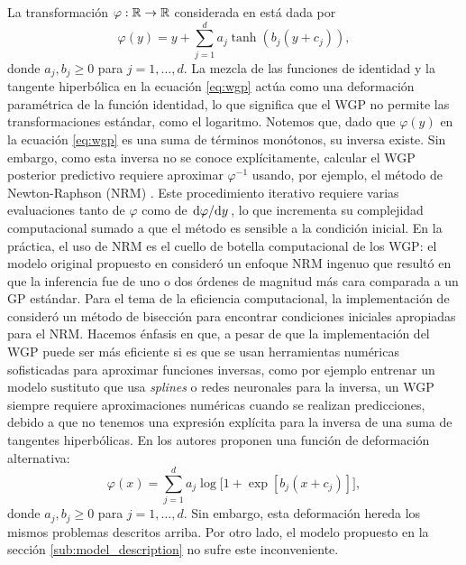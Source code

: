 La transformación \(\varphi : \mathbb{R} \to \mathbb{R}\) considerada en \cite{snelson2004warped} está dada por
\begin{equation}
	\label{eq:wgp}
	\varphi (y) = y + \sum_{j=1}^{d} a_{j} \tanh(b_{j}(y + c_{j})),
\end{equation}
donde \(a_{j}, b_{j} \geq 0\) para \(j = 1, \dotsc, d\). La mezcla de las funciones de identidad y la tangente hiperbólica en la ecuación \eqref{eq:wgp} actúa como una deformación paramétrica de la función identidad, lo que significa que el WGP no permite las transformaciones estándar, como el logaritmo. Notemos que, dado que \(\varphi(y)\) en la ecuación \eqref{eq:wgp} es una suma de términos monótonos, su inversa existe. Sin embargo, como esta inversa no se conoce explícitamente, calcular el WGP posterior predictivo requiere aproximar \(\varphi^{-1}\) usando, por ejemplo, el método de Newton-Raphson (NRM) \cite{atkinson2008introduction}. Este procedimiento iterativo requiere varias evaluaciones tanto de \(\varphi\) como de \(\dv*{\varphi}{y}\), lo que incrementa su complejidad computacional sumado a que el método es sensible a la condición inicial. En la práctica, el uso de NRM es el cuello de botella computacional de los WGP: el modelo original propuesto en \cite{snelson2004warped} consideró un enfoque NRM ingenuo que resultó en que la inferencia fue de uno o dos órdenes de magnitud más cara comparada a un GP estándar. Para el tema de la eficiencia computacional, la implementación de \cite{snelson2004warped} consideró un método de bisección para encontrar condiciones iniciales apropiadas para el NRM. Hacemos énfasis en que, a pesar de que la implementación del WGP puede ser más eficiente si es que se usan herramientas numéricas sofisticadas para aproximar funciones inversas, como por ejemplo entrenar un modelo sustituto que usa \emph{splines} o redes neuronales para la inversa, un WGP siempre requiere aproximaciones numéricas cuando se realizan predicciones, debido a que no tenemos una expresión explícita para la inversa de una suma de tangentes hiperbólicas. En \cite{wilson2010copula} los autores proponen una función de deformación alternativa:
\begin{equation*}
	\varphi(x) = \sum_{j=1}^{d} a_{j}\log\big[ 1 + \exp[b_{j}(x + c_{j})]\big],
\end{equation*}
donde \(a_{j}, b_{j} \geq 0\) para \(j=1, \dotsc, d\). Sin embargo, esta deformación hereda los mismos problemas descritos arriba. Por otro lado, el modelo propuesto en la sección \ref{sub:model_description} no sufre este inconveniente.


